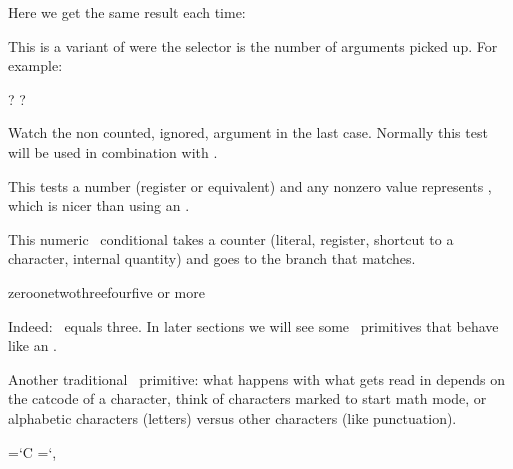 \typebuffer

Here we get the same result each time:

{\getbuffer}

\stopnewprimitive

\startnewprimitive[title={\prm {ifarguments}}]

This is a variant of  were the selector is the number of arguments
picked up. For example:

\startbuffer
\def\MyMacro#1#2#3{\ifarguments\0\else ?\fi} \MyMacro{A}{B}{C}
\def\MyMacro#1#0#3{\ifarguments\0\else ?\fi} \MyMacro{A}{B}{C}
\def\MyMacro#1#-#2{\ifarguments\0\or1\or2\or3\else ?\fi} \par
\stopbuffer

\typebuffer

Watch the non counted, ignored, argument in the last case. Normally this test will
be used in combination with .

{\getbuffer}

\stopnewprimitive

\startnewprimitive[title={\prm {ifboolean}}]

This tests a number (register or equivalent) and any nonzero value represents
, which is nicer than using an \type {\unless \ifcase}.

\stopnewprimitive

\startoldprimitive[title={\prm {ifcase}}]

This numeric \TEX\ conditional takes a counter (literal, register, shortcut to a
character, internal quantity) and goes to the branch that matches.

\startbuffer
{} zero\or one\or two\or three\or four\else five or more\fi
\stopbuffer

\typebuffer

Indeed: \inlinebuffer\ equals three. In later sections we will see some
\LUAMETATEX\ primitives that behave like an .

\stopoldprimitive

\startoldprimitive[title={\prm {ifcat}}]

Another traditional \TEX\ primitive: what happens with what gets read in depends
on the catcode of a character, think of characters marked to start math mode, or
alphabetic characters (letters) versus other characters (like punctuation).

\startbuffer
\def\A{A}\def\B{,} \chardef\C=`C \chardef\D=`, \def\AA{AA}


